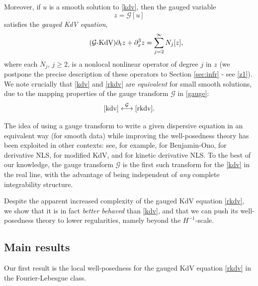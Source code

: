 \documentclass[%
11pt,  reqno]{amsart}
\newcommand{\5}{\textup{V}}
\newcommand{\jp}{\color{red}}
\theoremstyle{remark}
\newcommand{\Gc}{\mathcal{G}}
\numberwithin{equation}{section}
\numberwithin{theorem}{section}
\begin{document}
    Moreover, if $u$ is a smooth solution to \eqref{kdv}, then the gauged variable
    \begin{equation}\label{defi_z_intro}
z=\mathcal{G}[u]
    \end{equation}
satisfies the \emph{gauged KdV equation},
\begin{equation}
\label{rkdv}\tag{$\Gc$-KdV}
\partial_t z+ \partial_x^3 z = 
\sum_{j=2}^\infty 
N_j[z]
,
	\end{equation}
	where each $N_j$, $j\ge 2$, is a nonlocal nonlinear  operator of degree $j$ in $z$ (we postpone the precise description of these operators to Section \ref{sec:infr} - see \eqref{z1}). \\
    
    We note crucially that \eqref{kdv} and \eqref{rkdv} are \textit{equivalent} for small smooth solutions, due to the mapping properties of the gauge transform $\Gc$ in \eqref{gauge}:
    $$
\eqref{kdv} \overset{\Gc}{\longleftrightarrow} \eqref{rkdv}.
    $$
  


The idea of using a gauge transform to write a given dispersive equation in an equivalent way (for smooth data) while improving the well-posedness theory has been exploited in other contexts: see, for example,   \cite{IfrimTataru, MolinetPilod_bo, tao_bo} for Benjamin-Ono, \cite{CKSTT_dnls, Herr_dnls, takaoka_dnls} for derivative NLS, \cite{Chapouto_FL_mkdv} for modified KdV, and \cite{KishimotoTsutsumi_kdnls} for kinetic derivative NLS.
To {\jp the best of} our knowledge, the gauge transform $\Gc$ is the first such transform for the \eqref{kdv} in the real line, with the advantage of being independent of \emph{any} complete integrability structure.

  Despite the apparent increased complexity of the gauged KdV equation \eqref{rkdv}, we show that it is in fact \emph{better behaved} than \eqref{kdv}, and that we can push its well-posedness theory to lower regularities, namely beyond the $H^{-1}$-scale.

\subsection{Main results} Our first result is the local well-posedness for the gauged KdV equation \eqref{rkdv} in the Fourier-Lebesgue class.
    
\end{document}
